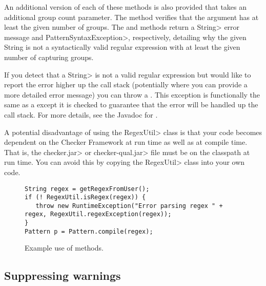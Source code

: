 An additional version of each of these methods is also provided that takes
an additional group count parameter. The
 method
verifies that the argument has at least the given number of groups. The
 and
methods return a \<String> error message and \<Pattern\-Syntax\-Exception>,
respectively, detailing why the given String is not a syntactically valid
regular expression with at least the given number of capturing groups.

\begin{sloppypar}
If you detect that a \<String> is not a valid regular expression but would like
to report the error higher up the call stack (potentially where you can
provide a more detailed error message) you can throw a
. This exception is
functionally the same as a
except it is checked to guarantee that the error will be handled up the
call stack.  For more details, see the Javadoc for
.
\end{sloppypar}

A potential disadvantage of using the \<RegexUtil> class is that your code becomes
dependent on the Checker Framework at run time as well as at compile time.
That is, the \<checker.jar> or \<checker-qual.jar> file
must be on the classpath at run time.
You can avoid this by
copying the \<RegexUtil> class into
your own code.

\begin{figure}
\begin{smaller}
\begin{Verbatim}
String regex = getRegexFromUser();
if (! RegexUtil.isRegex(regex)) {
   throw new RuntimeException("Error parsing regex " + regex, RegexUtil.regexException(regex));
}
Pattern p = Pattern.compile(regex);
\end{Verbatim}
\end{smaller}
\caption{Example use of  methods.}
\label{fig-regex-util-example}
\end{figure}

\subsection{Suppressing warnings\label{regex-suppressing-warnings}}

